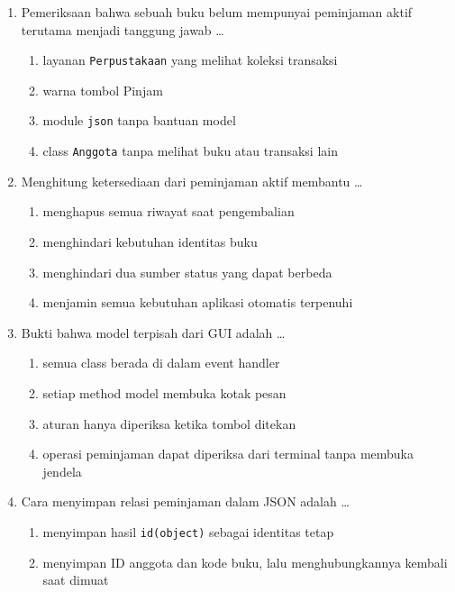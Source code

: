 \begin{enumerate}
\begin{enumerate}[label=\alph*.,itemsep=0pt]
    \item association karena peminjaman merujuk peminjamnya
    \item inheritance karena kedua class memiliki ID
    \item hubungan yang tidak perlu dicatat
  \end{enumerate}
  \item Pemeriksaan bahwa sebuah buku belum mempunyai peminjaman aktif terutama menjadi tanggung jawab \ldots
  \begin{enumerate}[label=\alph*.,itemsep=0pt]
    \item layanan \texttt{Perpustakaan} yang melihat koleksi transaksi
    \item warna tombol Pinjam
    \item module \texttt{json} tanpa bantuan model
    \item class \texttt{Anggota} tanpa melihat buku atau transaksi lain
  \end{enumerate}
  \item Menghitung ketersediaan dari peminjaman aktif membantu \ldots
  \begin{enumerate}[label=\alph*.,itemsep=0pt]
    \item menghapus semua riwayat saat pengembalian
    \item menghindari kebutuhan identitas buku
    \item menghindari dua sumber status yang dapat berbeda
    \item menjamin semua kebutuhan aplikasi otomatis terpenuhi
  \end{enumerate}
  \item Bukti bahwa model terpisah dari GUI adalah \ldots
  \begin{enumerate}[label=\alph*.,itemsep=0pt]
    \item semua class berada di dalam event handler
    \item setiap method model membuka kotak pesan
    \item aturan hanya diperiksa ketika tombol ditekan
    \item operasi peminjaman dapat diperiksa dari terminal tanpa membuka jendela
  \end{enumerate}
  \item Cara menyimpan relasi peminjaman dalam JSON adalah \ldots
  \begin{enumerate}[label=\alph*.,itemsep=0pt]
    \item menyimpan hasil \texttt{id(object)} sebagai identitas tetap
    \item menyimpan ID anggota dan kode buku, lalu menghubungkannya kembali saat dimuat

\end{enumerate}
\end{enumerate}
